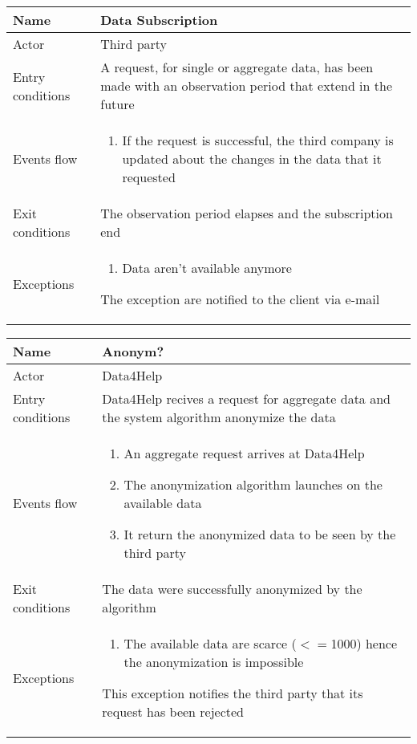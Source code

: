 \begin{table}[]
\begin{tabular}{|l|l|}
\hline
Name             & Data Subscription \\ \hline
Actor            & Third party \\ \hline
Entry conditions & A request, for single or aggregate data, has been made with an observation period that extend in the future \\ \hline
Events flow      & \begin{enumerate}
\item If the request is successful, the third company is updated about the changes in the data that it requested
\end{enumerate} \\ \hline
Exit conditions  & The observation period elapses and the subscription end \\ \hline
Exceptions       & \begin{enumerate}
\item Data aren't available anymore
\end{enumerate} The exception are notified to the client via e-mail \\ \hline
\end{tabular}
\end{table}

\begin{table}[]
\begin{tabular}{|l|l|}
\hline
Name             & Anonym? \\ \hline
Actor            & Data4Help \\ \hline
Entry conditions & Data4Help recives a request for aggregate data and the system algorithm anonymize the data \\ \hline
Events flow      & \begin{enumerate}
\item An aggregate request arrives at Data4Help
\item The anonymization algorithm launches on the available data
\item It return the anonymized data to be seen by the third party
\end{enumerate} \\ \hline
Exit conditions  & The data were successfully anonymized by the algorithm \\ \hline
Exceptions       & \begin{enumerate}
\item The available data are scarce ($<=$1000) hence the anonymization is impossible
\end{enumerate} This exception notifies the third party that its request has been rejected\\ \hline
\end{tabular}
\end{table}

